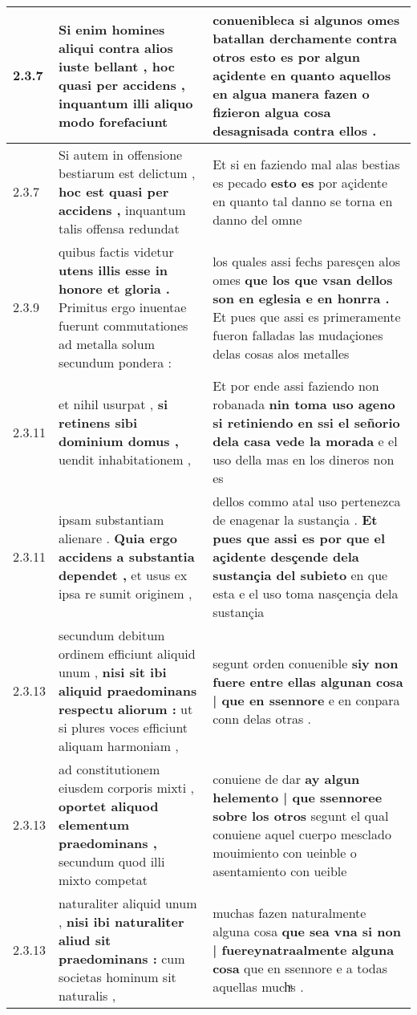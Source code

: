 \begin{tabular}{|p{1cm}|p{6.5cm}|p{6.5cm}|}
2.3.7 & Si enim homines aliqui contra alios iuste bellant , \textbf{ hoc quasi per accidens , } inquantum illi aliquo modo forefaciunt & conuenibleca si algunos omes batallan derchamente contra otros \textbf{ esto es por algun açidente en quanto aquellos en algua manera } fazen o fizieron algua cosa desagnisada contra ellos . \\\hline
2.3.7 & Si autem in offensione bestiarum est delictum , \textbf{ hoc est quasi per accidens , } inquantum talis offensa redundat & Et si en faziendo mal alas bestias es pecado \textbf{ esto es } por açidente en quanto tal danno se torna en danno del omne \\\hline
2.3.9 & quibus factis videtur \textbf{ utens illis esse in honore et gloria . } Primitus ergo inuentae fuerunt commutationes ad metalla solum secundum pondera : & los quales assi fechs paresçen alos omes \textbf{ que los que vsan dellos son en eglesia e en honrra . } Et pues que assi es primeramente fueron falladas las mudaçiones delas cosas alos metalles \\\hline
2.3.11 & et nihil usurpat , \textbf{ si retinens sibi dominium domus , } uendit inhabitationem , & Et por ende assi faziendo non robanada \textbf{ nin toma uso ageno si retiniendo en ssi el señorio dela casa vede la morada } e el uso della mas en los dineros non es \\\hline
2.3.11 & ipsam substantiam alienare . \textbf{ Quia ergo accidens a substantia dependet , } et usus ex ipsa re sumit originem , & dellos commo atal uso pertenezca de enagenar la sustançia . \textbf{ Et pues que assi es por que el açidente desçende dela sustançia del subieto } en que esta e el uso toma nasçençia dela sustançia \\\hline
2.3.13 & secundum debitum ordinem efficiunt aliquid unum , \textbf{ nisi sit ibi aliquid praedominans respectu aliorum : } ut si plures voces efficiunt aliquam harmoniam , & segunt orden conuenible \textbf{ siy non fuere entre ellas algunan cosa | que en ssennore } e en conpara conn delas otras . \\\hline
2.3.13 & ad constitutionem eiusdem corporis mixti , \textbf{ oportet aliquod elementum praedominans , } secundum quod illi mixto competat & conuiene de dar \textbf{ ay algun helemento | que ssennoree sobre los otros } segunt el qual conuiene aquel cuerpo mesclado mouimiento con ueinble o asentamiento con ueible \\\hline
2.3.13 & naturaliter aliquid unum , \textbf{ nisi ibi naturaliter aliud sit praedominans : } cum societas hominum sit naturalis , & muchas fazen naturalmente alguna cosa \textbf{ que sea vna si non | fuereynatraalmente alguna cosa } que en ssennore e a todas aquellas muchͣs . \\\hline

\end{tabular}
